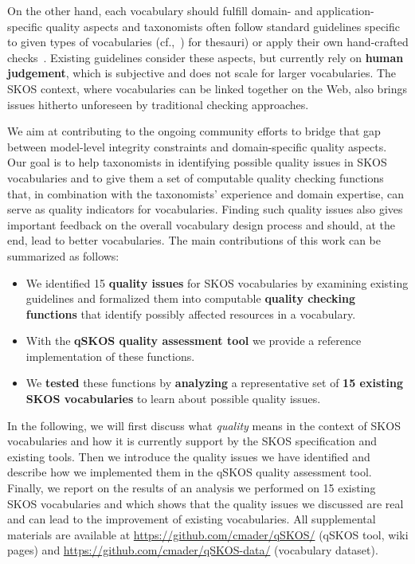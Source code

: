 On the other hand, each vocabulary should fulfill domain- and application-specific quality aspects and taxonomists often follow standard guidelines specific to given types of vocabularies (cf.,~\cite{ISO25964-1:2011,Z39.19:2005}) for thesauri) or apply their own hand-crafted checks~\cite{Coronado2009}. Existing guidelines consider these aspects, but currently rely on \textbf{human judgement}, which is subjective and does not scale for larger vocabularies. The SKOS context, where vocabularies can be linked together on the Web, also brings issues hitherto unforeseen by traditional checking approaches.


We aim at contributing to the ongoing community efforts to bridge that gap between model-level integrity constraints and domain-specific quality aspects. Our goal is to help taxonomists in identifying possible quality issues in SKOS vocabularies and to give them a set of computable quality checking functions that, in combination with the taxonomists' experience and domain expertise, can serve as quality indicators for vocabularies. Finding such quality issues also gives important feedback on the overall vocabulary design process and should, at the end, lead to better vocabularies. The main contributions of this work can be summarized as follows:

\begin{itemize}

	\item We identified 15 \textbf{quality issues} for SKOS vocabularies by examining existing guidelines and formalized them into computable \textbf{quality checking functions} that identify possibly affected resources in a vocabulary.
	
	\item With the \textbf{qSKOS quality assessment tool} we provide a reference implementation of these functions.

	\item We \textbf{tested} these functions by \textbf{analyzing} a representative set of \textbf{15 existing SKOS vocabularies} to learn about possible quality issues.

\end{itemize}

In the following, we will first discuss what \emph{quality} means in the context of SKOS vocabularies and how it is currently support by the SKOS specification and existing tools. Then we introduce the quality issues we have identified and describe how we implemented them in the qSKOS quality assessment tool. Finally, we report on the results of an analysis we performed on 15 existing SKOS vocabularies and which shows that the quality issues we discussed are real and can lead to the improvement of existing vocabularies. All supplemental materials are available at \url{https://github.com/cmader/qSKOS/} (qSKOS tool, wiki pages) and \url{https://github.com/cmader/qSKOS-data/} (vocabulary dataset).